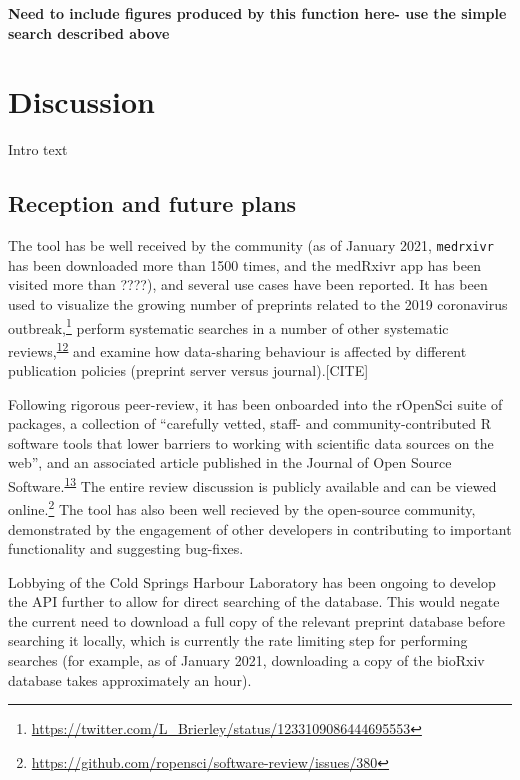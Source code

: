 \documentclass[a4paper, twoside]{templates/ociamthesis}
\begin{document}
\textbf{Need to include figures produced by this function here- use the simple search described above}

\hypertarget{discussion}{%
\section{Discussion}\label{discussion}}

Intro text

\hypertarget{reception-and-future-plans}{%
\subsection{Reception and future plans}\label{reception-and-future-plans}}

The tool has be well received by the community (as of January 2021, \texttt{medrxivr} has been downloaded more than 1500 times, and the medRxivr app has been visited more than ????), and several use cases have been reported. It has been used to visualize the growing number of preprints related to the 2019 coronavirus outbreak,\footnote{\url{https://twitter.com/L_Brierley/status/1233109086444695553}} perform systematic searches in a number of other systematic reviews,\textsuperscript{\protect\hyperlink{ref-noone2020}{12}} and examine how data-sharing behaviour is affected by different publication policies (preprint server versus journal).{[}CITE{]}

Following rigorous peer-review, it has been onboarded into the rOpenSci suite of packages, a collection of ``carefully vetted, staff- and community-contributed R software tools that lower barriers to working with scientific data sources on the web'', and an associated article published in the Journal of Open Source Software.\textsuperscript{\protect\hyperlink{ref-mcguinness2020a}{13}} The entire review discussion is publicly available and can be viewed online.\footnote{\url{https://github.com/ropensci/software-review/issues/380}} The tool has also been well recieved by the open-source community, demonstrated by the engagement of other developers in contributing to important functionality and suggesting bug-fixes.

Lobbying of the Cold Springs Harbour Laboratory has been ongoing to develop the API further to allow for direct searching of the database. This would negate the current need to download a full copy of the relevant preprint database before searching it locally, which is currently the rate limiting step for performing searches (for example, as of January 2021, downloading a copy of the bioRxiv database takes approximately an hour).
\end{document}
